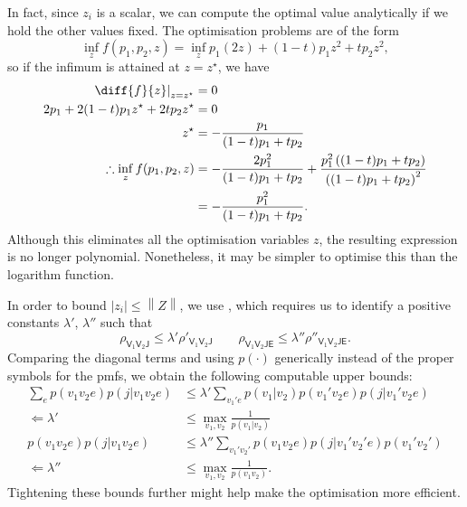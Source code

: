 \documentclass[10pt, a4paper]{article}
\numberwithin{equation}{section} %
\theoremstyle{definition}
\theoremstyle{plain}
\newcommand{\norm}[1]{\left\lVert#1\right\rVert}
\newcommand{\abs}[1]{\left\lvert#1\right\rvert}
\newcommand{\?}{\mathrel{?}} %
\newcommand{\crv}[1]{\mathsf{#1}}
\begin{document}
    In fact, since \(z_i\) is a scalar, we can compute the optimal value analytically if we hold the other values fixed. The optimisation problems are of the form
    \begin{equation}
      \inf_z f(p_1, p_2, z) = \inf_z p_1(2z) + (1-t) p_1 z^2 + t p_2 z^2,
    \end{equation}
    so if the infimum is attained at \(z=z^{\star}\), we have
    \begin{align}
      \left. \diff{f}{z} \right|_{z=z^{\star}} &= 0 \\
      2p_1 + 2(1-t) p_1 z^{\star} + 2t p_2 z^{\star} &= 0 \\
      z^{\star} &= -\frac{p_1}{(1-t)p_1 + tp_2} \\
      \therefore \inf_z f(p_1, p_2, z) &= -\frac{2p_1^2}{(1-t)p_1 + tp_2} + \frac{p_1^2 \left( (1-t)p_1 + tp_2 \right)}{{\left((1-t)p_1 + tp_2\right)}^2} \\
                                       &= -\frac{p_1^2}{(1-t)p_1 + tp_2}.
    \end{align}
    Although this eliminates all the optimisation variables \(z\), the resulting expression is no longer polynomial. Nonetheless, it may be simpler to optimise this than the logarithm function.

    In order to bound \(\abs{z_i} \leq \norm{Z}\), we use , which requires us to identify a positive constants \(\lambda'\), \(\lambda''\) such that
      \[ \rho_{\crv{V}_1\crv{V}_2\crv{J}} \leq \lambda' \rho'_{\crv{V}_1\crv{V}_2\crv{J}} \qquad \rho_{\crv{V}_1\crv{V}_2\crv{JE}} \leq \lambda'' \rho''_{\crv{V}_1\crv{V}_2\crv{JE}}. \]
    Comparing the diagonal terms and using \(p(\cdot)\) generically instead of the proper symbols for the pmfs, we obtain the following computable upper bounds:
    \begin{align}
      \sum_{e} p(v_1v_2e) p(j|v_1v_2e) &\leq \lambda' \sum_{v_1' e} p(v_1|v_2) p(v_1'v_2e) p(j|v_1'v_2e) \\
      \Leftarrow \lambda' &\leq \max_{v_1,v_2} \frac{1}{p(v_1|v_2)} \\
      p(v_1v_2e) p(j|v_1v_2e) &\leq \lambda'' \sum_{v_1' v_2'} p(v_1v_2e) p(j|v_1'v_2'e) p(v_1'v_2') \\
      \Leftarrow \lambda'' &\leq \max_{v_1,v_2} \frac{1}{p(v_1 v_2)}.
    \end{align}
    Tightening these bounds further might help make the optimisation more efficient.
\end{document}
